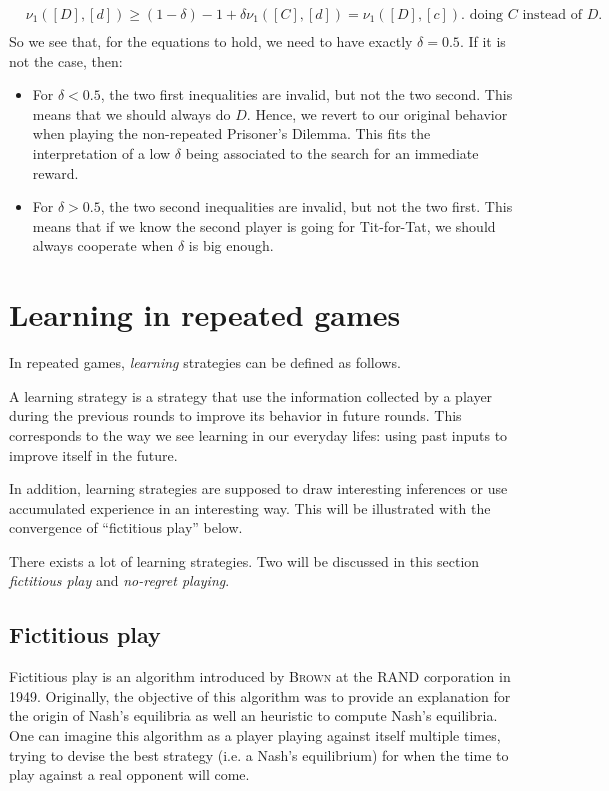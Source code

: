 \begin{example}
$$\begin{aligned}
& \nu_1([D],[d])  \geq (1-\delta) -1 + \delta \nu_1([C],[d])  = \nu_1([D],[c]). \text{ doing $C$ instead of $D$. } \\
\end{aligned}
$$
So we see that, for the equations to hold, we need to have exactly $\delta = 0.5$.
If it is not the case, then:
\begin{itemize}
\item For $\delta < 0.5$, the two first inequalities are invalid, but not the two second. This means that we should always do $D$.
Hence, we revert to our original behavior when playing the non-repeated Prisoner's Dilemma. This fits the interpretation of a low $\delta$ being associated to the search for an immediate reward.
\item For $\delta > 0.5$, the two second inequalities are invalid, but not the two first.
This means that if we know the second player is going for Tit-for-Tat, we should always cooperate when $\delta$ is big enough.
\end{itemize}



\end{example}

\section{Learning in repeated games}
In repeated games, \textit{learning} strategies can be defined as follows.

\begin{definition}
    A learning strategy is a strategy that use the information collected by a
    player during the previous rounds to improve its behavior in future rounds.
    This corresponds to the way we see learning in our everyday lifes: using
    past inputs to improve itself in the future. 
\end{definition}

In addition, learning strategies are supposed to draw interesting inferences
or use accumulated experience in an interesting way. This will be illustrated
with the convergence of ``fictitious play'' below.

There exists a lot of learning strategies. Two will be discussed in this
section \emph{fictitious play} and \emph{no-regret playing}.

\subsection{Fictitious play}
Fictitious play is an algorithm introduced by \textsc{Brown} at the RAND
corporation in 1949. Originally, the objective of this algorithm was to
provide an explanation for the origin of Nash's equilibria as well an heuristic
to compute Nash's equilibria. One can imagine this algorithm as a player
playing against itself multiple times, trying to devise the best strategy
(i.e. a Nash's equilibrium) for when the time to play against a real opponent
will come. 


